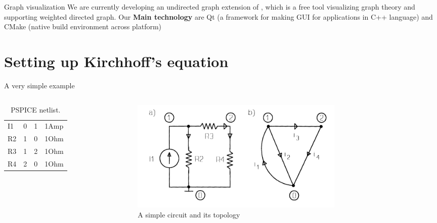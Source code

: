 \documentclass[xcolor=dvipsnames]{beamer}
\begin{document}
\begin{frame}{Graph visualization}
We are currently developing an undirected graph extension of 
\href{https://github.com/leannejdong/simple-graph-tool}{}, which 
is a free tool visualizing graph theory and supporting weighted directed graph. Our \textbf{Main technology}
are Qt (a framework for making GUI for applications in C++ language) and CMake (native build environment across platform)
	
\end{frame}

\section{Setting up Kirchhoff's equation}

\begin{frame}{A very simple example}
    \begin{columns}
        \begin{column}{.45\textwidth}
            \begin{table}[h!]
	    	\caption{PSPICE netlist.}
	    	\label{tab:netlist}
	   		 \begin{tabular}{l|l|l|l} %
	      		\hline
	      		I1 & 0 & 1 & 1Amp\\
	      		R2 & 1 & 0 & 1Ohm\\
	      		R3 & 1 & 2 & 1Ohm\\
	      		R4 & 2 & 0 & 1Ohm
	    	\end{tabular}
			\end{table}
        \end{column}
		\begin{column}{.75\textwidth}
         \begin{figure}[!ht]
  			\centering
    		\includegraphics[width=0.7\textwidth]{circuitt.png}
   			 \caption[figure 4]{A simple circuit and its topology}
    		\label{fig:eg4}
    	 \end{figure}
      	\end{column}
    \end{columns}
\end{frame}
\end{document}
